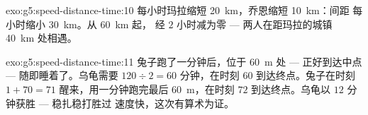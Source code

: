 \begin{solution}{exo:g5:speed-distance-time:10}
每小时玛拉缩短 \qty{20}{km}，乔恩缩短 \qty{10}{km}：间距
每小时缩小 \qty{30}{km}。从 \qty{60}{km} 起，
经 $2$ 小时减为零 --- 两人在距玛拉的城镇 \qty{40}{km} 处相遇。
\end{solution}

\begin{solution}{exo:g5:speed-distance-time:11}
兔子跑了一分钟后，位于 \qty{60}{m} 处 ---
正好到达中点 --- 随即睡着了。乌龟需要 $120 \div 2 = 60$
分钟，在时刻 $60$ 到达终点。兔子在时刻 $1 + 70 =
71$ 醒来，用一分钟跑完最后 \qty{60}{m}，在时刻
$72$ 到达终点。乌龟以 $12$ 分钟获胜 --- 稳扎稳打胜过
速度快，这次有算术为证。
\end{solution}

